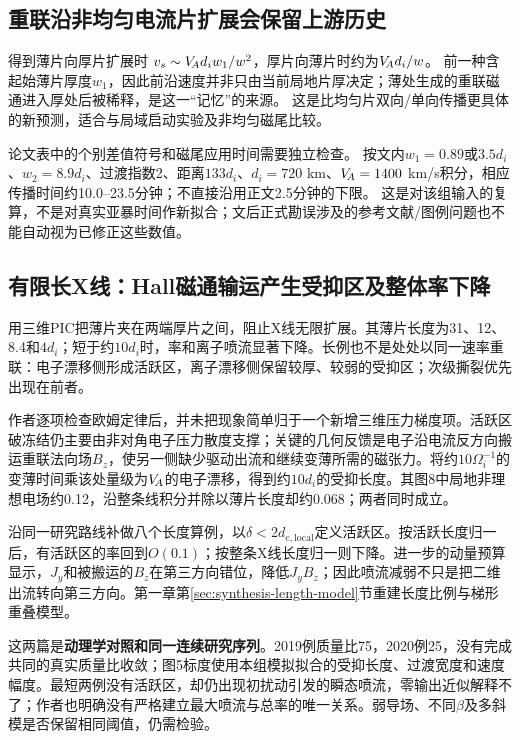 \subsection{重联沿非均匀电流片扩展会保留上游历史}
\citet{L294}得到薄片向厚片扩展时
$v_s\sim V_{\!A} d_iw_1/w^2$，厚片向薄片时约为$V_{\!A} d_i/w$。
前一种含起始薄片厚度$w_1$，因此前沿速度并非只由当前局地片厚决定；薄处生成的重联磁通进入厚处后被稀释，是这一“记忆”的来源。
这是比均匀片双向/单向传播更具体的新预测，适合与局域启动实验及非均匀磁尾比较。

论文表中的个别差值符号和磁尾应用时间需要独立检查。
按文内$w_1=0.89$或$3.5d_i$、$w_2=8.9d_i$、过渡指数2、距离$133d_i$、$d_i=720$ km、$V_{\!A}=1400$ km/s积分，相应传播时间约10.0--23.5分钟；不直接沿用正文2.5分钟的下限。
这是对该组输入的复算，不是对真实亚暴时间作新拟合；文后正式勘误涉及的参考文献/图例问题也不能自动视为已修正这些数值。

\subsection{有限长X线：Hall磁通输运产生受抑区及整体率下降}\label{sec:synthesis-finite}
\citet{F659}用三维PIC把薄片夹在两端厚片之间，阻止X线无限扩展。其薄片长度为31、12、8.4和$4d_i$；短于约$10d_i$时，率和离子喷流显著下降。长例也不是处处以同一速率重联：电子漂移侧形成活跃区，离子漂移侧保留较厚、较弱的受抑区；次级撕裂优先出现在前者。

作者逐项检查欧姆定律后，并未把现象简单归于一个新增三维压力梯度项。活跃区破冻结仍主要由非对角电子压力散度支撑；关键的几何反馈是电子沿电流反方向搬运重联法向场$B_z$，使另一侧缺少驱动出流和继续变薄所需的磁张力。将约$10\Omega_i^{-1}$的变薄时间乘该处量级为$V_{\!A}$的电子漂移，得到约$10d_i$的受抑长度。其图8中局地非理想电场约0.12，沿整条线积分并除以薄片长度却约0.068；两者同时成立。

\citet{F792}沿同一研究路线补做八个长度算例，以$\delta<2d_{e,\mathrm{local}}$定义活跃区。按活跃长度归一后，有活跃区的率回到$O(0.1)$；按整条X线长度归一则下降。进一步的动量预算显示，$J_y$和被搬运的$B_z$在第三方向错位，降低$J_yB_z$；因此喷流减弱不只是把二维出流转向第三方向。第一章第\ref{sec:synthesis-length-model}节重建长度比例与梯形重叠模型。

这两篇是\textbf{动理学对照和同一连续研究序列}。2019例质量比75，2020例25，没有完成共同的真实质量比收敛；图5标度使用本组模拟拟合的受抑长度、过渡宽度和速度幅度。最短两例没有活跃区，却仍出现初扰动引发的瞬态喷流，零输出近似解释不了；作者也明确没有严格建立最大喷流与总率的唯一关系。弱导场、不同$\beta$及多斜模是否保留相同阈值，仍需检验。

